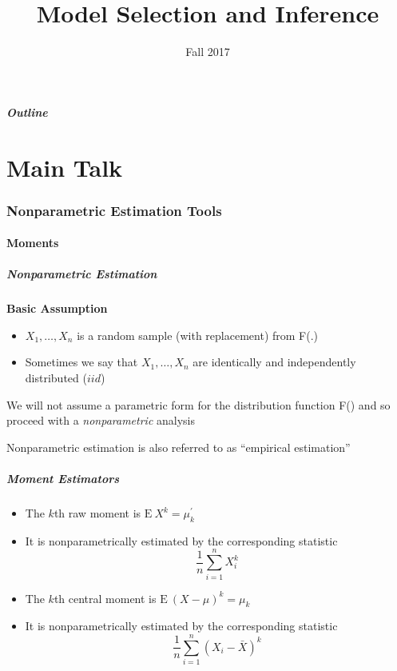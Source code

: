 \documentclass{beamer}
\title[Model Selection]{Model Selection and Inference}
\date[Fall 2017]{Fall 2017}
\begin{document}
\frame{\titlepage}

\begin{frame}
  \frametitle{Outline}
     \tableofcontents[part=1]
\end{frame}

\part<presentation>{Main Talk}
\section{Nonparametric Estimation Tools}\label{S:NonParTools}

\subsection{Moments}
\begin{frame}%
\frametitle{Nonparametric Estimation} \textbf{Basic Assumption}
\vspace{4mm}

\begin{itemize}
\item $X_1, \ldots, X_n$ is a random sample (with replacement) from
F(.) \vspace{4mm}

\item Sometimes we say that $X_1, \ldots, X_n$ are identically and independently distributed
($iid$) \vspace{4mm}
\end{itemize}

We will not assume a parametric form for the distribution function F() and so proceed with a \textit{nonparametric} analysis
\vspace{4mm}

Nonparametric estimation is also referred to as ``empirical estimation''
\end{frame}

\begin{frame}%
\frametitle{Moment Estimators}
\begin{itemize}
\item The $k$th raw moment is $\mathrm{E~} X^k = \mu^{\prime}_k$ \vspace{4mm}

\item It is nonparametrically estimated by the corresponding statistic
$$ \frac{1}{n} \sum_{i=1}^n X_i^k $$ \vspace{4mm}

\item The $k$th central moment is $\mathrm{E~} (X-\mu)^k = \mu_k$ \vspace{4mm}

\item It is nonparametrically estimated by the corresponding statistic
$$ \frac{1}{n} \sum_{i=1}^n \left(X_i-\bar{X}\right)^k $$
\end{itemize}
\end{frame}
\end{document}
